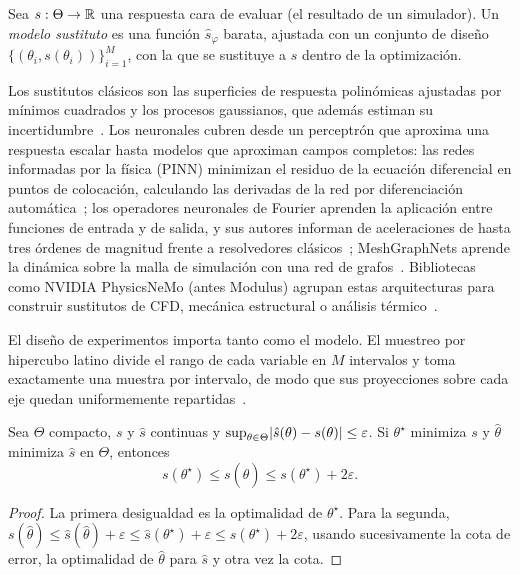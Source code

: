 \begin{definicion}\label{def:sustituto}
Sea $s:\Theta\to\mathbb{R}$ una respuesta cara de evaluar (el resultado de un simulador). Un \emph{modelo sustituto} es una función $\hat s_\varphi$ barata, ajustada con un conjunto de diseño $\{(\theta_i,s(\theta_i))\}_{i=1}^M$, con la que se sustituye a $s$ dentro de la optimización.
\end{definicion}

Los sustitutos clásicos son las superficies de respuesta polinómicas ajustadas por mínimos cuadrados y los procesos gaussianos, que además estiman su incertidumbre~\cite{kw}. Los neuronales cubren desde un perceptrón que aproxima una respuesta escalar hasta modelos que aproximan campos completos: las redes informadas por la física (PINN) minimizan el residuo de la ecuación diferencial en puntos de colocación, calculando las derivadas de la red por diferenciación automática~\cite{pinn}; los operadores neuronales de Fourier aprenden la aplicación entre funciones de entrada y de salida, y sus autores informan de aceleraciones de hasta tres órdenes de magnitud frente a resolvedores clásicos~\cite{fno}; MeshGraphNets aprende la dinámica sobre la malla de simulación con una red de grafos~\cite{mgn}. Bibliotecas como NVIDIA PhysicsNeMo (antes Modulus) agrupan estas arquitecturas para construir sustitutos de CFD, mecánica estructural o análisis térmico~\cite{physicsnemo}.

El diseño de experimentos importa tanto como el modelo. El muestreo por hipercubo latino divide el rango de cada variable en $M$ intervalos y toma exactamente una muestra por intervalo, de modo que sus proyecciones sobre cada eje quedan uniformemente repartidas~\cite{kw}.

\begin{proposicion}\label{prop:2eps}
Sea $\Theta$ compacto, $s$ y $\hat s$ continuas y $\sup_{\theta\in\Theta}\lvert\hat s(\theta)-s(\theta)\rvert\le\varepsilon$. Si $\theta^\star$ minimiza $s$ y $\hat\theta$ minimiza $\hat s$ en $\Theta$, entonces
\[
s(\theta^\star)\le s(\hat\theta)\le s(\theta^\star)+2\varepsilon .
\]
\end{proposicion}

\begin{proof}
La primera desigualdad es la optimalidad de $\theta^\star$. Para la segunda, $s(\hat\theta)\le\hat s(\hat\theta)+\varepsilon\le\hat s(\theta^\star)+\varepsilon\le s(\theta^\star)+2\varepsilon$, usando sucesivamente la cota de error, la optimalidad de $\hat\theta$ para $\hat s$ y otra vez la cota.
\end{proof}

